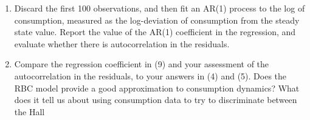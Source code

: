 \documentclass[11pt]{article}
\begin{document}
\begin{enumerate}
\begin{align}
\tilde{c}_{t + 1} &= E_t \left\{\frac{\beta \theta \overline{K}^{\theta - 1}}{A} \cdot (\theta - 1) \tilde{k}_{t + 1}\right\}\\
&= E_t \left\{\beta \theta \cdot \left(\frac{\beta \theta \overline{z}}{A - \beta (1 - \delta)}\right)\cdot \frac{\theta - 1}{A} \cdot \tilde{c}_{t + 1}\right\}\\
&= \beta \theta \cdot \left(\frac{\beta \theta \overline{z}}{A - \beta (1 - \delta)}\right) \cdot \frac{\theta - 1}{A} \cdot E_t\left\{\tilde{k}_{t + 1}\right\}\\
\intertext{I'm a bit confused about this expectation, because it's taken at time $t$ and all the terms in $\tilde{k}_{t + 1}$ have $t$ subscripts, so shouldn't they be known? But I thought that consumers chose their consumption based on the expected next-period shock. One last thing that I'm pretty sure is me being dumb/lazy, but it seems like I need to use $\tilde{k}$ to calculate $k$ in order to get $y$ and $i$ and solve the problem. Is there a straightforward way to do this? }
\tilde{k} &\equiv \log \left(\frac{\hat{k}}{\overline{k}}\right)\\
e^{\tilde{k}} &= \frac{\hat{K}}{\overline{K}}\\
&= \frac{K_t}{\overline{K}A_t}\\
\intertext{Do we have a nice expression/number for $\overline{K}$, or do I have to solve for this using an approach from Gary's half of the class?}
\end{align}

\newpage
\item Discard the first 100 observations, and then fit an AR(1) process to the
log of consumption, measured as the log-deviation of consumption from the
steady state value. Report the value of the AR(1) coefficient in the regression,
and evaluate whether there is autocorrelation in the residuals.

\newpage
\item Compare the regression coefficient in (9) and your assessment of the
autocorrelation in the residuals, to your answers in (4) and (5). Does the RBC
model provide a good approximation to consumption dynamics? What does it
tell us about using consumption data to try to discriminate between the Hall
\end{enumerate}
\end{document}

